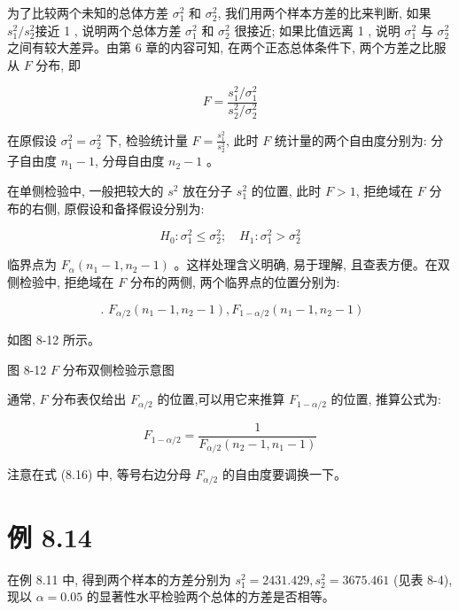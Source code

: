 \documentclass[10pt]{article}
\begin{document}
\begin{CJK*}{UTF8}{bsmi}
为了比较两个未知的总体方差 $\sigma_{1}^{2}$ 和 $\sigma_{2}^{2}$, 我们用两个样本方差的比来判断, 如果 $s_{1}^{2} / s_{2}^{2}$接近 1 , 说明两个总体方差 $\sigma_{1}^{2}$ 和 $\sigma_{2}^{2}$ 很接近; 如果比值远离 1 , 说明 $\sigma_{1}^{2}$ 与 $\sigma_{2}^{2}$ 之间有较大差异。由第 6 章的内容可知, 在两个正态总体条件下, 两个方差之比服从 $F$ 分布, 即


\begin{equation*}
F=\frac{s_{1}^{2} / \sigma_{1}^{2}}{s_{2}^{2} / \sigma_{2}^{2}} \tag{8.15}
\end{equation*}


在原假设 $\sigma_{1}^{2}=\sigma_{2}^{2}$ 下, 检验统计量 $F=\frac{s_{1}^{2}}{s_{2}^{2}}$, 此时 $F$ 统计量的两个自由度分别为: 分子自由度 $n_{1}-1$, 分母自由度 $n_{2}-1$ 。

在单侧检验中, 一般把较大的 $s^{2}$ 放在分子 $s_{1}^{2}$ 的位置, 此时 $F>1$, 拒绝域在 $F$ 分布的右侧, 原假设和备择假设分别为:

$$
H_{0}: \sigma_{1}^{2} \leqslant \sigma_{2}^{2} ; \quad H_{1}: \sigma_{1}^{2}>\sigma_{2}^{2}
$$

临界点为 $F_{\alpha}\left(n_{1}-1, n_{2}-1\right)$ 。这样处理含义明确, 易于理解, 且查表方便。在双侧检验中, 拒绝域在 $F$ 分布的两侧, 两个临界点的位置分别为:

$$
\text { . } F_{\alpha / 2}\left(n_{1}-1, n_{2}-1\right), F_{1-\alpha / 2}\left(n_{1}-1, n_{2}-1\right)
$$

如图 8-12 所示。

\begin{center}
\end{center}

图 8-12 $F$ 分布双侧检验示意图

通常, $F$ 分布表仅给出 $F_{\alpha / 2}$ 的位置,可以用它来推算 $F_{1-\alpha / 2}$ 的位置, 推算公式为:


\begin{equation*}
F_{1-\alpha / 2}=\frac{1}{F_{\alpha / 2}\left(n_{2}-1, n_{1}-1\right)} \tag{8.16}
\end{equation*}


注意在式 (8.16) 中, 等号右边分母 $F_{\alpha / 2}$ 的自由度要调换一下。

\section*{例 8.14}
在例 8.11 中, 得到两个样本的方差分别为 $s_{1}^{2}=2431.429, s_{2}^{2}=3675.461$ (见表 8-4),现以 $\alpha=0.05$ 的显著性水平检验两个总体的方差是否相等。


\end{CJK*}
\end{document}
